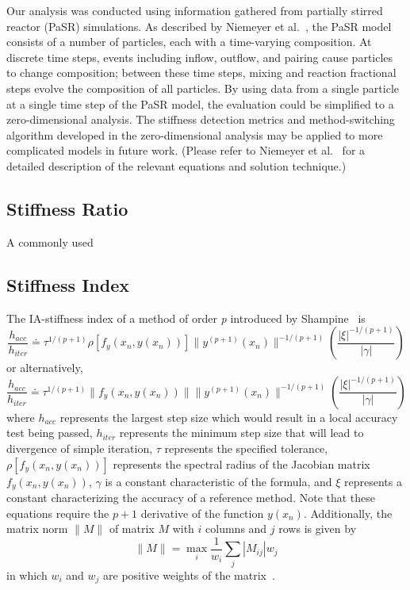 \documentclass[12pt]{ussci}
\begin{document}

Our analysis was conducted using information gathered from partially stirred reactor (PaSR) simulations.
As described by Niemeyer et al.~\cite{Niemeyer:2017}, the PaSR model consists of a number of particles, each with a time-varying composition.
At discrete time steps, events including inflow, outflow, and pairing cause particles to change composition; between these time steps, mixing and reaction fractional steps evolve the composition of all particles.
By using data from a single particle at a single time step of the PaSR model, the evaluation could be simplified to a zero-dimensional analysis.
The stiffness detection metrics and method-switching algorithm developed in the zero-dimensional analysis may be applied to more complicated models in future work.
(Please refer to Niemeyer et al.~\cite{Niemeyer:2017} for a detailed description of the relevant equations and solution technique.)

\subsection{Stiffness Ratio}

A commonly used 

\subsection{Stiffness Index}

The IA-stiffness index of a method of order \textit{p} introduced by Shampine~\cite{Shampine1982} is
\begin{equation}
    \frac{h_{acc}}{h_{iter}} \doteq \tau ^ {1/(p + 1)} \rho [f_y(x_n,y(x_n))] \|y^{(p+1)}(x_n)\|^{-1/(p+1)} \left( \frac{|\xi|^{-1/(p+1)}}{|\gamma|} \right)
\end{equation}
or alternatively,
\begin{equation}
    \frac{h_{acc}}{h_{iter}} \doteq \tau ^ {1/(p + 1)} \|f_y(x_n,y(x_n))\|\|y^{(p+1)}(x_n)\|^{-1/(p+1)} \left( \frac{|\xi|^{-1/(p+1)}}{|\gamma|} \right)
\end{equation}
where $h_{acc}$ represents the largest step size which would result in a local accuracy test being passed, $h_{iter}$ represents the minimum step size that will lead to divergence of simple iteration, $\tau$ represents the specified tolerance, $\rho [f_y(x_n,y(x_n))]$ represents the spectral radius of the Jacobian matrix $f_y(x_n,y(x_n))$, $\gamma$ is a constant characteristic of the formula, and $\xi$ represents a constant characterizing the accuracy of a reference method.
Note that these equations require the $p+1$ derivative of the function $y(x_n)$.
Additionally, the matrix norm $\|M\|$ of matrix $M$ with $i$ columns and $j$ rows is given by
\begin{equation}
    \|M\| = \max_{i} \frac{1}{w_i} \sum_{j} |M_{ij}|w_j
\end{equation}
in which \(w_i\) and \(w_j\) are positive weights of the matrix~\cite{Shampine1985}.
\end{document}
